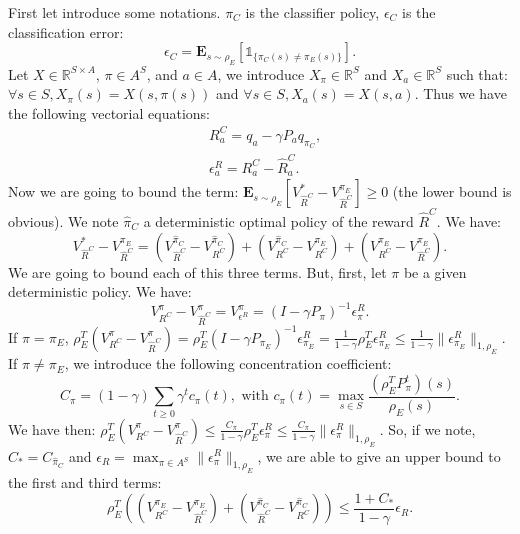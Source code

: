 \documentclass[11pt]{article}
\newcommand{\E}{\mathbf{E}}
\begin{document}
First let introduce some notations. $\pi_C$ is the classifier policy, $\epsilon_C$ is the classification error:
\begin{equation}
\epsilon_C=\E_{s\sim\rho_E}[\mathds{1}_{\{\pi_C(s)\neq\pi_E(s)\}}].
\end{equation}
Let $X\in\mathbb{R}^{S\times A}$, $\pi\in A^S$, and $a\in A$, we introduce $X_\pi\in\mathbb{R}^S$ and $X_a\in\mathbb{R}^S$ such that: $\forall s\in S, X_\pi(s)=X(s,\pi(s))$ and $\forall s\in S, X_a(s)=X(s,a)$.
Thus we have the following vectorial equations:
\begin{align}
&R^C_a=q_a-\gamma P_aq_{\pi_C},
\\
&\epsilon^R_a=R^C_a-\hat{R}^C_a.
\end{align}
Now we are going to bound the term: $\E_{s\sim\rho_E}[V^*_{\hat{R}^C}-V^{\pi_E}_{\hat{R}^C}]\geq0$ (the lower bound is obvious).
We note $\hat{\pi}_C$ a deterministic optimal policy of the reward $\hat{R}^C$. We have:
\begin{equation}
V^*_{\hat{R}^C}-V^{\pi_E}_{\hat{R}^C}=(V^{\hat{\pi}_C}_{\hat{R}^C}-V^{\hat{\pi}_C}_{R^C})+(V^{\hat{\pi}_C}_{R^C}-V^{\pi_E}_{R^C})+(V^{\pi_E}_{R^C}-V^{\pi_E}_{\hat{R}^C}).
\end{equation}
We are going to bound each of this three terms. But, first, let $\pi$ be a given deterministic policy. We have:
\begin{equation}
V^{\pi}_{R^C}-V^{\pi}_{\hat{R}^C}=V^{\pi}_{\epsilon^R}=(I-\gamma P_\pi)^{-1}\epsilon^R_{\pi}.
\end{equation}
If $\pi=\pi_E$, $\rho_E^T(V^{\pi}_{R^C}-V^{\pi}_{\hat{R}^C})=\rho_E^T(I-\gamma P_{\pi_E})^{-1}\epsilon^R_{\pi_E}=\frac{1}{1-\gamma}\rho_E^T\epsilon^R_{\pi_E}\leq\frac{1}{1-\gamma}\|\epsilon^R_{\pi_E}\|_{1,\rho_E}$.
If $\pi\neq\pi_E$, we introduce the following concentration coefficient:
\begin{equation}
C_{\pi}=(1-\gamma)\sum_{t\geq0}\gamma^tc_{\pi}(t), \text{ with } c_{\pi}(t)=\max_{s\in S}\frac{(\rho_E^TP^t_\pi)(s)}{\rho_E(s)}.
\end{equation}
We have then: $\rho_E^T(V^{\pi}_{R^C}-V^{\pi}_{\hat{R}^C})\leq\frac{C_\pi}{1-\gamma}\rho_E^T\epsilon^R_{\pi}\leq\frac{C_\pi}{1-\gamma}\|\epsilon^R_{\pi}\|_{1,\rho_E}$. So, if we note, $C_*=C_{\hat{\pi}_C}$ and $\epsilon_R=\max_{\pi\in A^S}\|\epsilon_\pi^R\|_{1,\rho_E}$, we are able to give an upper bound to the first and third terms:
\begin{equation}
\rho_E^T((V^{\pi_E}_{R^C}-V^{\pi_E}_{\hat{R}^C})+(V^{\hat{\pi}_C}_{\hat{R}^C}-V^{\hat{\pi}_C}_{R^C}))\leq\frac{1+C_*}{1-\gamma}\epsilon_R.
\end{equation}
\end{document}
